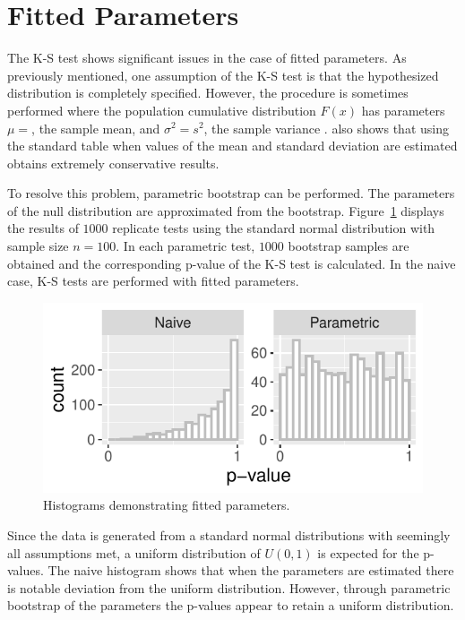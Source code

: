 \documentclass[12pt, letterpaper, titlepage]{article}
\makeatletter
\newcommand*{\Xbar}{}%
\DeclareRobustCommand*{\Xbar}{%
  \mathpalette\@Xbar{}%
}
\newcommand*{\@Xbar}[2]{%
  \sbox0{$#1\mathrm{X}\m@th$}%
  \sbox2{$#1X\m@th$}%
  \rlap{%
    \hbox to\wd2{%
      \hfill
      $\overline{%
        \vrule width 0pt height\ht0 %
        \kern\wd0 %
      }$%
    }%
  }%
  \copy2 %
}
\makeatother
\begin{document}
\hypertarget{sec:fitted}{%
\section{Fitted Parameters}\label{sec:fitted}}

The K-S test shows significant issues in the case of fitted parameters. As previously mentioned, one assumption of the K-S test is that the hypothesized distribution is completely specified. However, the procedure is sometimes performed where the population cumulative distribution $F(x)$ has parameters $\mu=\Xbar$, the sample mean, and $\sigma^2=s^2$, the sample variance \citep{Lilliefors}. \citet{Lilliefors} also shows that using the standard table when values of the mean and standard deviation are estimated obtains extremely conservative results. 

To resolve this problem, parametric bootstrap can be performed. The parameters of the null distribution are approximated from the bootstrap. Figure~\ref{fig:hist_parametric} displays the results of $1000$ replicate tests using the standard normal distribution with sample size $n=100$. In each parametric test, $1000$ bootstrap samples are obtained and the corresponding p-value of the K-S test is calculated. In the naive case, K-S tests are performed with fitted parameters.

\begin{figure}[!ht]
  \centering
  \includegraphics[scale=0.7]{hist_parametric}
  \caption{Histograms demonstrating fitted parameters.}
  \label{fig:hist_parametric}
\end{figure}

Since the data is generated from a standard normal distributions with seemingly all assumptions met, a uniform distribution of $U(0,1)$ is expected for the p-values. The naive histogram shows that when the parameters are estimated there is notable deviation from the uniform distribution. However, through parametric bootstrap of the parameters the p-values appear to retain a uniform distribution.
\end{document}
